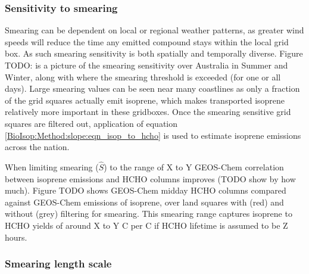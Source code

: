     
    
    

    \subsubsection{Sensitivity to smearing}
    
      Smearing can be dependent on local or regional weather patterns, as greater wind speeds will reduce the time any emitted compound stays within the local grid box.
      As such smearing sensitivity is both spatially and temporally diverse.
      Figure TODO: is a picture of the smearing sensitivity over Australia in Summer and Winter, along with where the smearing threshold is exceeded (for one or all days).
      Large smearing values can be seen near many coastlines as only a fraction of the grid squares actually emit isoprene, which makes transported isoprene relatively more important in these gridboxes.
      Once the smearing sensitive grid squares are filtered out, application of equation \ref{BioIsop:Method:slope:eqn_isop_to_hcho} is used to estimate isoprene emissions across the nation.
      
      
      
      When limiting smearing ($\hat{S}$) to the range of X to Y GEOS-Chem correlation between isoprene emissions and HCHO columns improves (TODO show by how much). 
      Figure TODO shows GEOS-Chem midday HCHO columns compared against GEOS-Chem emissions of isoprene, over land squares with (red) and without (grey) filtering for smearing.
      This smearing range captures isoprene to HCHO yields of around X to Y C per C if HCHO lifetime is assumed to be Z hours.
    
    \subsubsection{Smearing length scale}
    
